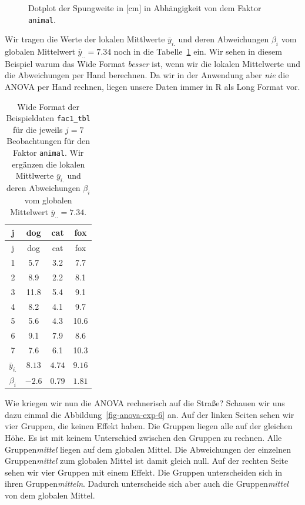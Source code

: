 \documentclass[
  letterpaper,
  DIV=11,
  oneside]{scrreport}
\begin{document}
\begin{figure}
\begin{minipage}[t]{0.33\linewidth}
{{}

}

\end{minipage}%

\caption{\label{fig-anova-exp-5}Dotplot der Spungweite in {[}cm{]} in
Abhängigkeit von dem Faktor \texttt{animal}.}

\end{figure}

Wir tragen die Werte der lokalen Mittlwerte \(\bar{y}_{i.}\) und deren
Abweichungen \(\beta_i\) vom globalen Mittelwert \(\bar{y}_{..} = 7.34\)
noch in die Tabelle~\ref{tbl-fac1-wide-02} ein. Wir sehen in diesem
Beispiel warum das Wide Format \emph{besser} ist, wenn wir die lokalen
Mittelwerte und die Abweichungen per Hand berechnen. Da wir in der
Anwendung aber \emph{nie} die ANOVA per Hand rechnen, liegen unsere
Daten immer in R als Long Format vor.

\hypertarget{tbl-fac1-wide-02}{}
\begin{longtable}[]{@{}cccc@{}}
\caption{\label{tbl-fac1-wide-02}Wide Format der Beispieldaten
\texttt{fac1\_tbl} für die jeweils \(j=7\) Beobachtungen für den Faktor
\texttt{animal}. Wir ergänzen die lokalen Mittlwerte \(\bar{y}_{i.}\)
und deren Abweichungen \(\beta_i\) vom globalen Mittelwert
\(\bar{y}_{..} = 7.34\).}\tabularnewline
\toprule()
j & dog & cat & fox \\
\midrule()
\endfirsthead
\toprule()
j & dog & cat & fox \\
\midrule()
\endhead
1 & 5.7 & 3.2 & 7.7 \\
2 & 8.9 & 2.2 & 8.1 \\
3 & 11.8 & 5.4 & 9.1 \\
4 & 8.2 & 4.1 & 9.7 \\
5 & 5.6 & 4.3 & 10.6 \\
6 & 9.1 & 7.9 & 8.6 \\
7 & 7.6 & 6.1 & 10.3 \\
\(\bar{y}_{i.}\) & \(8.13\) & \(4.74\) & \(9.16\) \\
\(\beta_i\) & \(-2.6\) & \(0.79\) & \(1.81\) \\
\bottomrule()
\end{longtable}

Wie kriegen wir nun die ANOVA rechnerisch auf die Straße? Schauen wir
uns dazu einmal die Abbildung~\ref{fig-anova-exp-6} an. Auf der linken
Seiten sehen wir vier Gruppen, die keinen Effekt haben. Die Gruppen
liegen alle auf der gleichen Höhe. Es ist mit keinem Unterschied
zwischen den Gruppen zu rechnen. Alle Gruppen\emph{mittel} liegen auf
dem globalen Mittel. Die Abweichungen der einzelnen Gruppen\emph{mittel}
zum globalen Mittel ist damit gleich null. Auf der rechten Seite sehen
wir vier Gruppen mit einem Effekt. Die Gruppen unterscheiden sich in
ihren Gruppen\emph{mitteln}. Dadurch unterscheide sich aber auch die
Gruppen\emph{mittel} von dem globalen Mittel.
\end{document}
